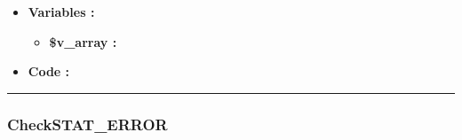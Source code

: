 \documentclass[a4paper,10pt]{article}
\begin{document}
\begin{itemize}
    \item \textbf{Variables :}
    \begin{itemize}
        \item \textbf{\color{orange}\$v\_array\color{white} :} \\[1\baselineskip]
    \end{itemize}


    \item \textbf{Code :}
\end{itemize}



\color{blue}\par\noindent\rule{\textwidth}{0.4pt}\color{white}

\color{blue}
\subsubsection{CheckSTAT\_ERROR}\color{white}
\end{document}
